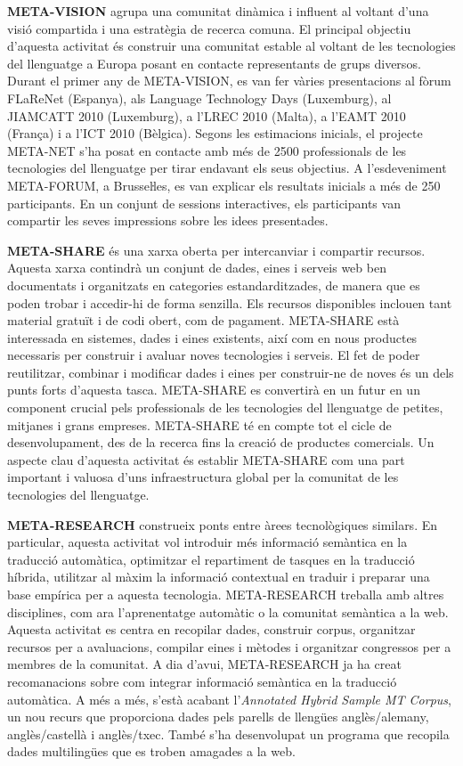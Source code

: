 \begin{multicols}{2}
\textbf{META-VISION} agrupa una comunitat dinàmica i influent al voltant d’una visió compartida i una estratègia de recerca comuna. El principal objectiu d’aquesta activitat és construir una comunitat estable al voltant de les tecnologies del llenguatge a Europa posant en contacte representants de grups diversos. Durant el primer any de META-VISION, es van fer vàries presentacions al fòrum FLaReNet (Espanya), als Language Technology Days (Luxemburg), al JIAMCATT 2010 (Luxemburg), a l’LREC 2010 (Malta), a l’EAMT 2010 (França) i a l’ICT 2010 (Bèlgica). Segons les estimacions inicials, el projecte META-NET s’ha posat en contacte amb més de 2500 professionals de les tecnologies del llenguatge per tirar endavant els seus objectius. A l’esdeveniment META-FORUM, a Brusseŀles, es van explicar els resultats inicials a més de 250 participants. En un conjunt de sessions interactives, els participants van compartir les seves impressions sobre les idees presentades.   

\textbf{META-SHARE} és una xarxa oberta per intercanviar i compartir recursos. Aquesta xarxa contindrà un conjunt de dades, eines i serveis web ben documentats i organitzats en categories estandarditzades, de manera que es poden trobar i accedir-hi de forma senzilla. Els recursos disponibles inclouen tant material gratuït i de codi obert, com de pagament. META-SHARE està interessada en sistemes, dades i eines existents, així com en nous productes necessaris per construir i avaluar noves tecnologies i serveis. El fet de poder reutilitzar, combinar i modificar dades i eines per construir-ne de noves és un dels punts forts d’aquesta tasca. META-SHARE es convertirà en un futur en un component crucial pels professionals de les tecnologies del llenguatge de petites, mitjanes i grans empreses. META-SHARE té en compte tot el cicle de desenvolupament, des de la recerca fins la creació de productes comercials. Un aspecte clau d’aquesta activitat és establir META-SHARE com una part important i valuosa d’uns infraestructura global per la comunitat de les tecnologies del llenguatge. 

\textbf{META-RESEARCH} construeix ponts entre àrees tecnològiques similars. En particular, aquesta activitat vol introduir més informació semàntica en la traducció automàtica, optimitzar el repartiment de tasques en la traducció híbrida, utilitzar al màxim la informació contextual en traduir i preparar una base empírica per a aquesta tecnologia. META-RESEARCH treballa amb altres disciplines, com ara l’aprenentatge automàtic o la comunitat semàntica a la web. Aquesta activitat es centra en recopilar dades, construir corpus, organitzar recursos per a avaluacions, compilar eines i mètodes i organitzar congressos per a membres de la comunitat. A dia d’avui, META-RESEARCH ja ha creat recomanacions sobre com integrar informació semàntica en la traducció automàtica. A més a més, s’està acabant l’\textit{Annotated Hybrid Sample MT Corpus}, un nou recurs que proporciona dades pels parells de llengües anglès/alemany, anglès/castellà i anglès/txec. També s’ha desenvolupat un programa que recopila dades multilingües que es troben amagades a la web. 
 
\end{multicols}

